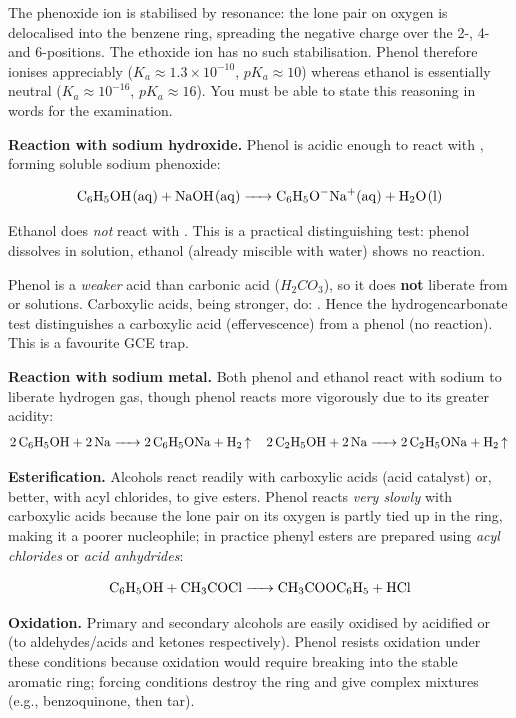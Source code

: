 \documentclass[11pt]{article}
\newcommand{\cle}[1]{{\popxbold\color{popdark}#1}}
\begin{document}
\begin{propriete}
The \cle{phenoxide ion} is stabilised by \cle{resonance}: the lone pair on oxygen is delocalised into the benzene ring, spreading the negative charge over the 2-, 4- and 6-positions. The ethoxide ion has no such stabilisation. Phenol therefore ionises appreciably ($K_a \approx 1.3 \times 10^{-10}$, $pK_a \approx 10$) whereas ethanol is essentially neutral ($K_a \approx 10^{-16}$, $pK_a \approx 16$). You must be able to state this reasoning in words for the examination.
\end{propriete}

\textbf{Reaction with sodium hydroxide.} Phenol is acidic enough to react with , forming soluble sodium phenoxide:

\[
\ce{C6H5OH(aq) + NaOH(aq) -> C6H5O^{-}Na^{+}(aq) + H2O(l)}
\]

Ethanol does \emph{not} react with . This is a practical distinguishing test: phenol dissolves in  solution, ethanol (already miscible with water) shows no reaction.

\begin{attention}
Phenol is a \emph{weaker} acid than carbonic acid ($H_2CO_3$), so it does \textbf{not} liberate  from  or  solutions. Carboxylic acids, being stronger, do:
.
Hence the hydrogencarbonate test distinguishes a carboxylic acid (effervescence) from a phenol (no reaction). This is a favourite GCE trap.
\end{attention}

\textbf{Reaction with sodium metal.} Both phenol and ethanol react with sodium to liberate hydrogen gas, though phenol reacts more vigorously due to its greater acidity:
\[
\ce{2C6H5OH + 2Na -> 2C6H5ONa + H2 ^}
\quad
\ce{2C2H5OH + 2Na -> 2C2H5ONa + H2 ^}
\]

\textbf{Esterification.} Alcohols react readily with carboxylic acids (acid catalyst) or, better, with acyl chlorides, to give esters. Phenol reacts \emph{very slowly} with carboxylic acids because the lone pair on its oxygen is partly tied up in the ring, making it a poorer nucleophile; in practice phenyl esters are prepared using \emph{acyl chlorides} or \emph{acid anhydrides}:

\[
\ce{C6H5OH + CH3COCl -> CH3COOC6H5 + HCl}
\]

\textbf{Oxidation.} Primary and secondary alcohols are easily oxidised by acidified  or  (to aldehydes/acids and ketones respectively). Phenol resists oxidation under these conditions because oxidation would require breaking into the stable aromatic ring; forcing conditions destroy the ring and give complex mixtures (e.g., benzoquinone, then tar).
\end{document}
